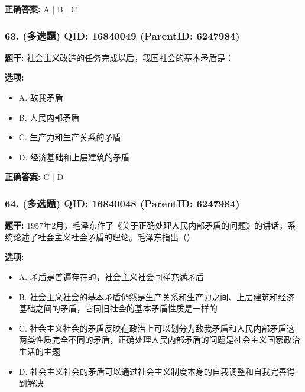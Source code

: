 \documentclass[12pt,UTF8]{ctexart}
\begin{document}
\textbf{正确答案:}
A | B | C

\vspace{0.3em}\hrulefill\vspace{0.7em}

\subsubsection*{63. (多选题) \small QID: 16840049 (ParentID: 6247984)}

\textbf{题干:}
社会主义改造的任务完成以后，我国社会的基本矛盾是：



\textbf{选项:}
\begin{itemize}[leftmargin=*]

  \item A. 敌我矛盾

  \item B. 人民内部矛盾

  \item C. 生产力和生产关系的矛盾

  \item D. 经济基础和上层建筑的矛盾

\end{itemize}

\textbf{正确答案:}
C | D

\vspace{0.3em}\hrulefill\vspace{0.7em}

\subsubsection*{64. (多选题) \small QID: 16840048 (ParentID: 6247984)}

\textbf{题干:}
1957年2月，毛泽东作了《关于正确处理人民内部矛盾的问题》的讲话，系统论述了社会主义社会矛盾的理论。毛泽东指出（）



\textbf{选项:}
\begin{itemize}[leftmargin=*]

  \item A. 矛盾是普遍存在的，社会主义社会同样充满矛盾

  \item B. 社会主义社会的基本矛盾仍然是生产关系和生产力之间、上层建筑和经济基础之间的矛盾，它同旧社会的基本矛盾性质是一样的

  \item C. 社会主义社会的矛盾反映在政治上可以划分为敌我矛盾和人民内部矛盾这两类性质完全不同的矛盾，正确处理人民内部矛盾的问题是社会主义国家政治生活的主题

  \item D. 社会主义社会的矛盾可以通过社会主义制度本身的自我调整和自我完善得到解决

\end{itemize}
\end{document}
